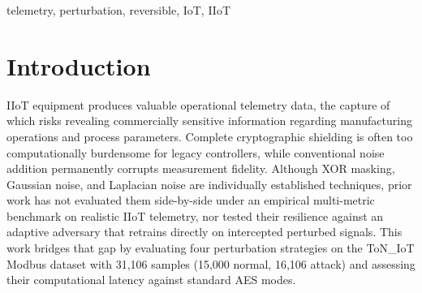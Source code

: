\documentclass[conference]{IEEEtran}
\begin{document}
\begin{abstract}
IIoT (Industrial Internet of Things) systems constantly stream telemetry data from sensors and machinery to the cloud, posing serious privacy and security challenges. Conventional encryption methods are computationally expensive for resource-constrained legacy edge devices. Under our Python prototype streaming benchmark, standard AES-128 incurs roughly 59--70$\times$ higher per-packet latency than our lightweight scheme, while conventional noise-based perturbation methods irreversibly distort telemetry. We introduce and evaluate a lightweight, fully reversible data perturbation pipeline for IIoT telemetry, providing an empirical multi-metric evaluation across reversibility, adversarial accuracy, and computational latency under realistic legacy-device constraints. To assess the balance between privacy and utility, a dataset comprising 31,106 IIoT intrusion detection samples covering five distinct attack categories was employed. After training a baseline classifier that achieved 98.47\% binary detection accuracy on original data, we evaluated four perturbation techniques: Gaussian noise, Laplacian noise, 16-bit XOR, and packed 64-bit XOR against both a static adversary and an adaptive adversary retrained on intercepted telemetry.
\end{abstract}

\begin{IEEEkeywords}
telemetry, perturbation, reversible, IoT, IIoT
\end{IEEEkeywords}

\section{Introduction}
IIoT equipment produces valuable operational telemetry data, the capture of which risks revealing commercially sensitive information regarding manufacturing operations and process parameters. Complete cryptographic shielding is often too computationally burdensome for legacy controllers, while conventional noise addition permanently corrupts measurement fidelity. Although XOR masking, Gaussian noise, and Laplacian noise are individually established techniques, prior work has not evaluated them side-by-side under an empirical multi-metric benchmark on realistic IIoT telemetry, nor tested their resilience against an adaptive adversary that retrains directly on intercepted perturbed signals. This work bridges that gap by evaluating four perturbation strategies on the ToN\_IoT Modbus dataset with 31,106 samples (15,000 normal, 16,106 attack) and assessing their computational latency against standard AES modes.
\end{document}
